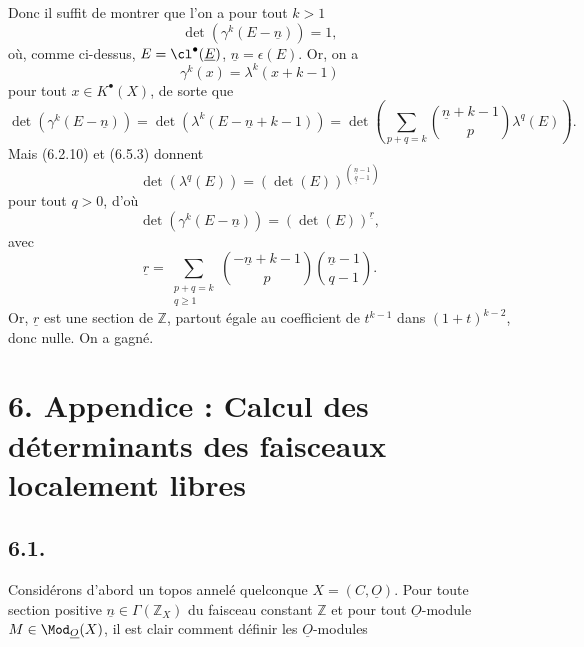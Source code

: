 
Donc il suffit de montrer que l'on a pour tout \(k>1\)
\[
 \det(\gamma^k(E-\underline{n}))=1,
\]
où, comme ci-dessus, \(E=\cl^{\bullet}(\underline E)\), \(\underline{n}=\epsilon(E)\). Or, on a
\[
 \gamma^k(x)=\lambda^k(x+k-1)
\]
pour tout \(x\in K^{\bullet}(X)\), de sorte que
\[
 \det(\gamma^k(E-\underline{n}))
 =
 \det(\lambda^k(E-\underline{n}+k-1))
 =
 \det\left(\sum_{p+q=k}\binom{\underline{n}+k-1}{p}\lambda^q(E)\right).
\]
Mais (6.2.10) et (6.5.3) donnent
\[
 \det(\lambda^q(E))=(\det(E))^{\binom{\underline{n}-1}{\underline{q}-1}}
\]
pour tout \(q>0\), d'où
\[
 \det(\gamma^k(E-\underline{n}))=(\det(E))^{\underline{r}},
\]
avec
\[
 \underline{r}=\sum_{\substack{p+q=k\\ q\geq1}}
 \binom{-\underline{n}+k-1}{p}\binom{\underline{n}-1}{q-1}.
\]
Or, \(\underline{r}\) est une section de \(\mathbb Z\), partout égale au coefficient de \(t^{k-1}\) dans \((1+t)^{k-2}\), donc nulle. On a gagné.

\section*{6. Appendice : Calcul des déterminants des faisceaux localement libres}

\subsection*{6.1.}
Considérons d'abord un topos annelé quelconque \(X=({C},\underline{O})\). Pour toute section positive \(\underline{n}\in\Gamma(\mathbb Z_X)\) du faisceau constant \(\mathbb Z\) et pour tout \(\underline{O}\)-module \(M\in\Mod_{\underline{O}}(X)\), il est clair comment définir les \(\underline{O}\)-modules
